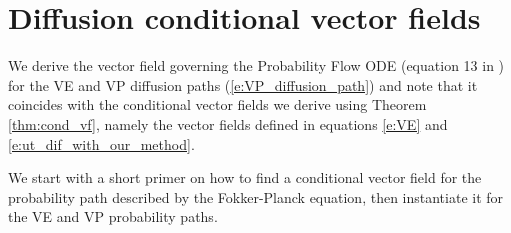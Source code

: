 \documentclass{article}
\begin{document}

\section{Diffusion conditional vector fields}
\label{A:diff_cond_VP}

We derive the vector field governing the Probability Flow ODE (equation 13 in \cite{song2020score}) for the VE and VP diffusion paths (\eqref{e:VP_diffusion_path}) and note that it coincides with the conditional vector fields we derive using Theorem \ref{thm:cond_vf}, namely the vector fields defined in equations \ref{e:VE} and \ref{e:ut_dif_with_our_method}.

We start with a short primer on how to find a conditional vector field for the probability path described by the Fokker-Planck equation, then instantiate it for the VE and VP probability paths. 
\end{document}
